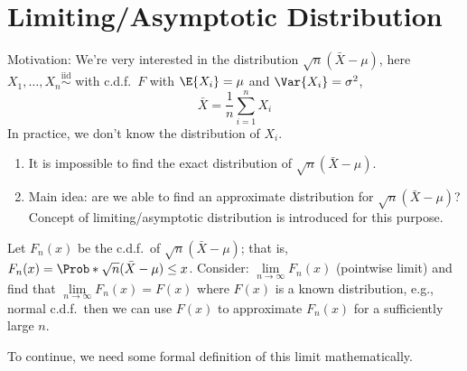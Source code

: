 \chapter{Limiting/Asymptotic Distribution}
Motivation: We're very interested in the distribution
$ \sqrt{n}(\bar{X}-\mu) $, here $ X_1,\ldots,X_n
    \stackrel{\text{iid}}{\sim} $ with c.d.f.\ $ F $ with
$ \E{X_i}=\mu $ and $ \Var{X_i}=\sigma^2 $,
\[ \bar{X}=\frac{1}{n} \sum_{i=1}^{n} X_i \]
In practice, we don't know the distribution of $ X_i $.
\begin{Remark}{}{}
    \begin{enumerate}[label=(\roman*)]
        \item It is impossible to find the exact distribution of
              $ \sqrt{n}(\bar{X}-\mu) $.
        \item Main idea: are we able to find an approximate
              distribution for $ \sqrt{n}(\bar{X}-\mu) $?
              Concept of limiting/asymptotic distribution
              is introduced for this purpose.
    \end{enumerate}
\end{Remark}
Let $ F_n(x) $ be the c.d.f.\ of $ \sqrt{n}(\bar{X}-\mu) $;
that is, $ F_n(x)=\Prob*{\sqrt{n}(\bar{X}-\mu)\le x} $.
Consider: $ \lim\limits_{{n} \to {\infty}} F_n(x) $ (pointwise
limit) and find that $ \lim\limits_{{n} \to {\infty}} F_n(x)=F(x) $
where $ F(x) $ is a known distribution, e.g., normal c.d.f.\
then we can use $ F(x) $ to approximate $ F_n(x) $ for a sufficiently
large $ n $.

To continue, we need some formal definition of this limit
mathematically.

